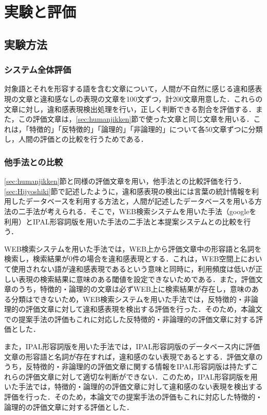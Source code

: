 \documentclass[japanese]{jnlp_1.4}
\begin{document}
\section{実験と評価}

\subsection{実験方法}

\subsubsection{システム全体評価}\label{sec:systemHyoka}

対象語とそれを形容する語を含む文章について，人間が不自然に感じる違和感表現の文章と違和感なしの表現の文章を100文ずつ，計200文章用意した．これらの文章に対し，違和感表現検出処理を行い，正しく判断できる割合を評価する．また，この評価文章は，\ref{sec:humanjikken}節で使った文章と同じ文章を用いる．これは，「特徴的」「反特徴的」「論理的」「非論理的」について各50文章ずつに分類し，人間の評価との比較を行うためである．

\subsubsection{他手法との比較}\label{sec:otherHyoka}

\ref{sec:humanjikken}節と同様の評価文章を用い，他手法との比較評価を行う．\ref{sec:Hijyoshiki}節で記述したように，違和感表現の検出には言葉の統計情報を利用したデータベースを利用する方法と，人間が記述したデータベースを用いる方法の二手法が考えられる．そこで，WEB検索システムを用いた手法（googleを利用）とIPAL形容詞版\cite{iPAL1990}を用いた手法の二手法と本提案システムとの比較を行う．

WEB検索システムを用いた手法では，WEB上から評価文章中の形容語と名詞を検索し，検索結果が0件の場合を違和感表現とする．これは，WEB空間上において使用されない語が違和感表現であるという意味と同時に，利用頻度は低いが正しい表現の検索結果に意味のある閾値を設定できないためである．また，評価文章のうち，特徴的・論理的の文章は必ずWEB上に検索結果が存在し，意味のある分類はできないため，WEB検索システムを用いた手法では，反特徴的・非論理的の評価文章に対して違和感表現を検出する評価を行った．そのため，本論文での提案手法の評価もこれに対応した反特徴的・非論理的の評価文章に対する評価とした．

また，IPAL形容詞版を用いた手法では，IPAL形容詞版のデータベース内に評価文章の形容語と名詞が存在すれば，違和感のない表現であるとする．評価文章のうち，反特徴的・非論理的の評価文章に関する情報をIPAL形容詞版は持たずこれらの評価文章に対して適切な判断ができない．このため，IPAL形容詞版を用いた手法では，特徴的・論理的の評価文章に対して違和感のない表現を検出する評価を行った．そのため，本論文での提案手法の評価もこれに対応した特徴的・論理的の評価文章に対する評価とした．
\end{document}
